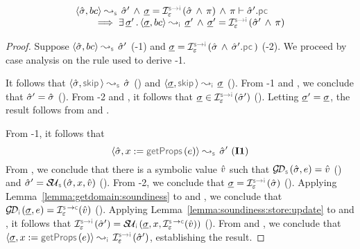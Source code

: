 \begin{lemma}\label{lemma:soundiness:basic:commands}
$$
\begin{array}{l}
\absbsemrule{\sstate, \bcmd}{\sstate'}{\symbolic} 
    \, \wedge \, \istate = \interpret{\symbinst}{\senv}(\sstate \, \wedge \, \pc)
    \, \wedge \, {\pc \vdash \sstate'.\pcsel} \\ \quad \quad
     \implies 
        \exists \, \istate' \, . \, \absbsemrule{\istate, \bcmd}{\istate'}{\instrumented} \, \wedge \, 
            \istate' = \interpret{\symbinst}{\senv}(\sstate' \, \wedge \, \pc)  
\end{array}
$$
\end{lemma}
\begin{proof}
{Suppose $\absbsemrule{\sstate, \bcmd}{\sstate'}{\symbolic}$ (\hyp{1}) and 
$\istate = \interpret{\symbinst}{\senv}(\sstate \, \wedge \, \sstate'.\pcsel)$ (\hyp{2}).}
We proceed by case analysis on the rule used to derive \hyp{1}. 
\vspace{3pt}

\noindent {} It follows that $\absbsemrule{\sstate, \jsilskip}{\sstate}{\symbolic}$ () and 
$\absbsemrule{\istate, \jsilskip}{\istate}{\instrumented}$ (). 
From \hyp{1} and , we conclude that $\hat{\sigma}' = \hat{\sigma}$ (). 
From \hyp{2} and , it follows that $\istate \in \interpret{\symbinst}{\senv}(\sstate')$ (). 
Letting $\underline{\sigma}' = \underline{\sigma}$, the result follows from  and . 
\vspace{5pt}

\noindent {} From \hyp{1}, it follows that 
$$
\absbsemrule{\sstate, \jvar := \getfields(\jsilexpr)}{\sstate'}{\symbolic} \text{ (\ieq{1})}
$$ 
From , we conclude that there is a symbolic value $\hat{v}$ such that 
$\absgetdomainfun{\symbolic}(\sstate, \jsilexpr) = \sexprv$ () 
and $\sstate' = \stupdt{\symbolic}(\sstate, \jvar, \sexprv)$ ().  
From \hyp{2}, we conclude that $\istate = \interpret{\symbinst}{\senv}(\sstate)$ (). 
Applying Lemma~\ref{lemma:getdomain:soundiness} to  and , we conclude that 
$\absgetdomainfun{\instrumented}(\istate, \jsilexpr) = \interpret{\symbconc}{\senv}(\sexprv)$ (). 
Applying Lemma~\ref{lemma:soundiness:store:update} to  and , it follows that 
$ \interpret{\symbinst}{\senv}(\sstate') = \stupdt{\instrumented}(\istate, \jvar, \interpret{\symbconc}{\senv}(\sexprv))$ (). 
From  and , we conclude that $\absbsemrule{\istate, \jvar := \getfields(\jsilexpr)}{\interpret{\symbinst}{\senv}(\sstate')}{\instrumented}$, establishing the result. 
\vspace{5pt}


\end{proof}
